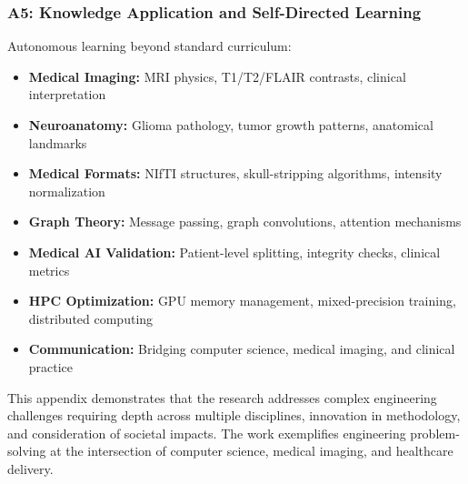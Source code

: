\subsubsection*{A5: Knowledge Application and Self-Directed Learning}

Autonomous learning beyond standard curriculum:

\begin{itemize}
    \item \textbf{Medical Imaging:} MRI physics, T1/T2/FLAIR contrasts, clinical interpretation
    \item \textbf{Neuroanatomy:} Glioma pathology, tumor growth patterns, anatomical landmarks
    \item \textbf{Medical Formats:} NIfTI structures, skull-stripping algorithms, intensity normalization
    \item \textbf{Graph Theory:} Message passing, graph convolutions, attention mechanisms
    \item \textbf{Medical AI Validation:} Patient-level splitting, integrity checks, clinical metrics
    \item \textbf{HPC Optimization:} GPU memory management, mixed-precision training, distributed computing
    \item \textbf{Communication:} Bridging computer science, medical imaging, and clinical practice
\end{itemize}

\vspace{5mm}

This appendix demonstrates that the research addresses complex engineering challenges requiring depth across multiple disciplines, innovation in methodology, and consideration of societal impacts. The work exemplifies engineering problem-solving at the intersection of computer science, medical imaging, and healthcare delivery.

\clearpage
